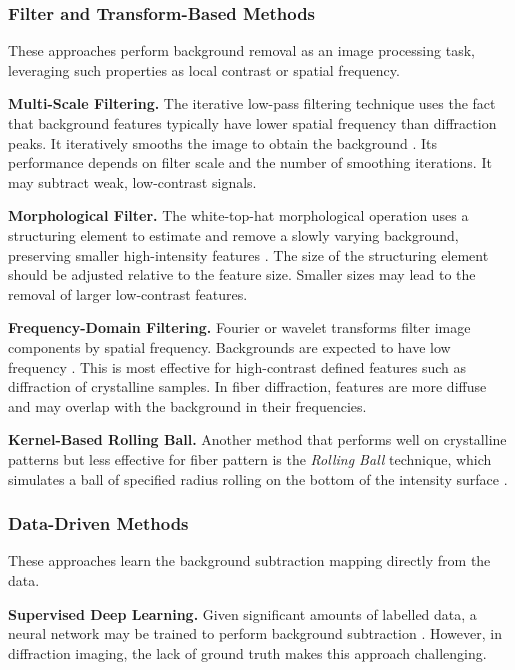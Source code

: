 \documentclass[iucr,review]{iucrjournals}
\begin{document}
    \subsubsection{Filter and Transform-Based Methods}
        These approaches perform background removal as an image processing task,
        leveraging such properties as local contrast or spatial frequency.

        \textbf{Multi-Scale Filtering.}
        The iterative low-pass filtering technique uses the fact that background features typically have
        lower spatial frequency than diffraction peaks. It iteratively smooths the image to obtain the background \cite{IvanovaMakowski1998}.
        Its performance depends on filter scale and the number of smoothing iterations. It may subtract weak, low-contrast signals.

        \textbf{Morphological Filter.}
        The white-top-hat morphological operation uses a structuring element
        to estimate and remove a slowly
        varying background, preserving smaller high-intensity features \cite{GonzalezWoodsDIP4e}.
        The size of the structuring element should be adjusted relative to the feature size.
        Smaller sizes may lead to the removal of larger low-contrast features.

        \textbf{Frequency-Domain Filtering.} 
        Fourier or wavelet transforms filter image components by spatial frequency. 
        Backgrounds are expected to have low frequency \cite{PolarBackground2024, WaveletBiomedOptExpress2021}.
        This is most effective for high-contrast defined features such as diffraction of crystalline samples.
        In fiber diffraction, features are more diffuse and may overlap with the background in their frequencies.

        \textbf{Kernel-Based Rolling Ball.} 
        Another method that performs well on crystalline patterns but less effective for fiber pattern is the \emph{Rolling Ball} technique, which 
        simulates a ball of specified radius rolling on the bottom of the intensity surface \cite{Sternberg1983}. 

    \subsubsection{Data-Driven Methods}
    These approaches learn the background subtraction mapping directly from the data.

        \textbf{Supervised Deep Learning.} Given significant amounts of labelled data, a neural network may be trained to perform background subtraction \cite{ArangurenCarmona2020}.
        However, in diffraction imaging, the lack of ground truth makes this approach challenging.
        
\end{document}

